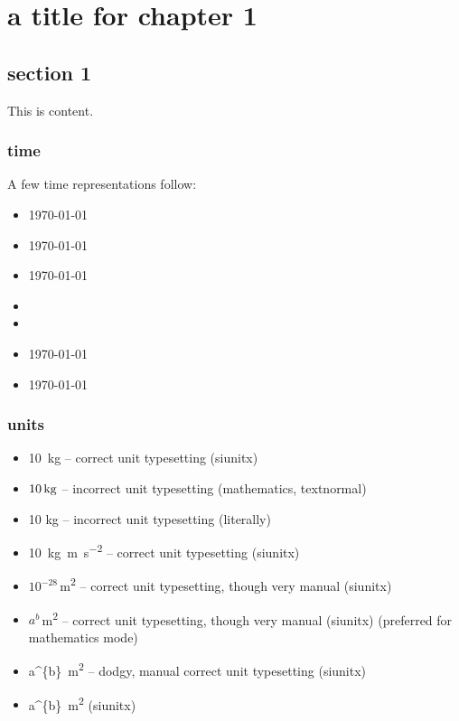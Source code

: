 \chapter{a title for chapter 1}
\label{chapter:chapter_1}
 
\section{section 1}
\label{section:section_1}

This is content.

\subsection{time}

A few time representations follow:

\begin{itemize}
\item \timeA\today
\item \timeB\today
\item \timeC\today
\item \timeD
\item \timeE
\item \timeF\today
\item \timeG\today
\end{itemize}

\subsection{units}

\begin{itemize}
\item \SI{10}{kg} -- correct unit typesetting (siunitx)
\item ${10\,\textnormal{kg}}$ -- incorrect unit typesetting (mathematics, textnormal)
\item 10 kg -- incorrect unit typesetting (literally)
\item \SI{10}{kg m s^{-2}} -- correct unit typesetting (siunitx)
\item ${10^{-28}}$\,\si{m^{2}} -- correct unit typesetting, though very manual (siunitx)
\item ${a^{b}}$\,\si{m^{2}} -- correct unit typesetting, though very manual (siunitx) (preferred for mathematics mode)
\item \SI[parse-numbers=false]{a^{b}}{m^{2}} -- dodgy, manual correct unit typesetting (siunitx)
\item \SI[parse-numbers=false, number-math-rm=\ensuremath]{a^{b}}{m^{2}} (siunitx)
\end{itemize}

